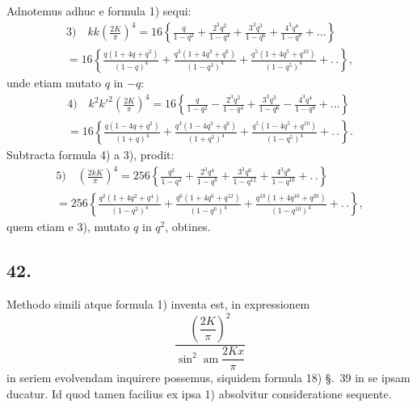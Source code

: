 \documentclass{article}
\begin{document}
Adnotemus adhuc e formula 1) sequi:
\[
\begin{gathered}
\text{3)}\quad kk\left(\frac{2K}{\pi}\right)^{4}=16\left\{\frac{q}{1-q^{2}}+\frac{2^{3}q^{2}}{1-q^{4}}+\frac{3^{3}q^{3}}{1-q^{6}}+\frac{4^{3}q^{4}}{1-q^{8}}+\ldots\right\}\\[1.5ex]
=16\left\{\frac{q(1+4q+q^{2})}{(1-q)^{4}}+\frac{q^{3}(1+4q^{3}+q^{6})}{(1-q^{3})^{4}}+\frac{q^{5}(1+4q^{5}+q^{10})}{(1-q^{5})^{4}}+.\,.\right\},
\end{gathered}
\]
unde etiam mutato $q$ in $-q$:
\[
\begin{gathered}
\text{4)}\quad k^{2}k'^{2}\left(\frac{2K}{\pi}\right)^{4}=16\left\{\frac{q}{1-q^{2}}-\frac{2^{3}q^{2}}{1-q^{4}}+\frac{3^{3}q^{3}}{1-q^{6}}-\frac{4^{3}q^{4}}{1-q^{8}}+\ldots\right\}\\[1.5ex]
=16\left\{\frac{q(1-4q+q^{2})}{(1+q)^{4}}+\frac{q^{3}(1-4q^{3}+q^{6})}{(1+q^{3})^{4}}+\frac{q^{5}(1-4q^{5}+q^{10})}{(1-q^{5})^{4}}+.\,.\right\}.
\end{gathered}
\]
Subtracta formula 4) a 3), prodit:
\[
\begin{gathered}
\text{5)}\quad\left(\frac{2kK}{\pi}\right)^{4}=256\left\{\frac{q^{2}}{1-q^{4}}+\frac{2^{3}q^{4}}{1-q^{8}}+\frac{3^{3}q^{6}}{1-q^{12}}+\frac{4^{3}q^{8}}{1-q^{16}}+.\,.\right\}\\[1.5ex]
=256\left\{\frac{q^{2}(1+4q^{2}+q^{4})}{(1-q^{2})^{4}}+\frac{q^{6}(1+4q^{6}+q^{12})}{(1-q^{6})^{4}}+\frac{q^{10}(1+4q^{10}+q^{20})}{(1-q^{10})^{4}}+.\,.\right\},
\end{gathered}
\]
quem etiam e 3), mutato $q$ in $q^{2}$, obtines.

\subsection*{42.}

Methodo simili atque formula 1) inventa est, in expressionem
\[
\frac{\left(\dfrac{2K}{\pi}\right)^{2}}{\sin^{2}\operatorname{am}\dfrac{2Kx}{\pi}}
\]
in seriem evolvendam inquirere possemus, siquidem formula 18) §.\ 39 in se ipsam ducatur. Id quod tamen facilius ex ipsa 1) absolvitur consideratione sequente.
\end{document}
